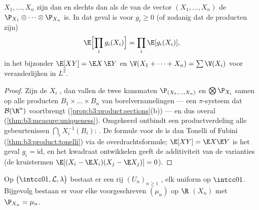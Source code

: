 \begin{theorem}\label{thm:b3:probability:independence}
$X_1, \dots, X_n$ zijn  dan en slechts dan als de
 van de vector $(X_1, \dots, X_n)$ de 
$\P_{X_1}\otimes\cdots\otimes\P_{X_n}$ is. In dat geval is voor
$g_i \geq 0$ (of zodanig dat de producten  zijn)
\[
\E\Bigl[\prod_ig_i(X_i)\Bigr] = \prod_i\E[g_i(X_i)],
\]
in het bijzonder $\E[XY] = \E X\,\E Y$ en $\V(X_1 + \dots + X_n)
= \sum\V(X_i)$ voor  veranderlijken in $L^2$.
\end{theorem}

\begin{proof}
Zijn de $X_i$ , dan vallen de twee kansmaten
$\P_{(X_1,\dots,X_n)}$ en $\bigotimes\P_{X_i}$ samen op alle
producten $B_1\times\dots\times B_n$ van borelverzamelingen ---
een $\pi$-systeem dat $\mathcal B(\R^n)$ voortbrengt
(\cref{prop:b3:product:sections}(b)) --- en dus overal
(\cref{thm:b3:measure:uniqueness}). Omgekeerd ontbindt een
productverdeling alle gebeurtenissen $\bigcap_iX_i^{-1}(B_i)$:
. De formule voor de  is dan
Tonelli of Fubini (\cref{thm:b3:product:tonelli}) via de
overdrachtsformule; $\E[XY] = \E X\E Y$ is het geval $g_i =
\mathrm{id}$, en het kwadraat ontwikkelen geeft de additiviteit
van de varianties (de kruistermen $\E[(X_i - \E X_i)(X_j - \E
X_j)] = 0$).
\end{proof}

\begin{theorem}
\label{thm:b3:probability:existence}
Op $\bigl(\intcc01, \mathcal L, \lambda\bigr)$ bestaat er een rij
$(U_n)_{n\geq1}$  , elk
uniform op $\intcc01$. Bijgevolg bestaan er voor elke
voorgeschreven  $(\mu_n)$ op $\R$ 
$(X_n)$ met $\P_{X_n} = \mu_n$.
\end{theorem}

